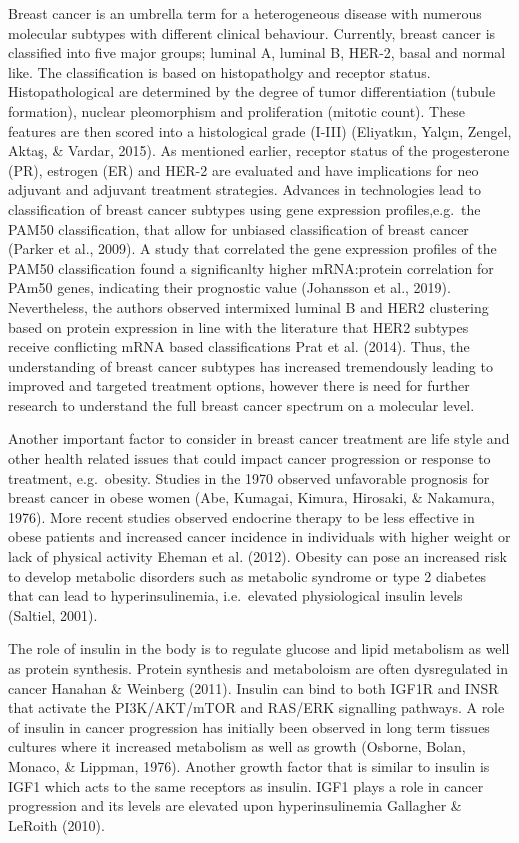 \documentclass[
  12pt,
  openany]{book}
\begin{document}
Breast cancer is an umbrella term for a heterogeneous disease with numerous molecular subtypes with different clinical behaviour. Currently, breast cancer is classified into five major groups; luminal A, luminal B, HER-2, basal and normal like. The classification is based on histopatholgy and receptor status. Histopathological are determined by the degree of tumor differentiation (tubule formation), nuclear pleomorphism and proliferation (mitotic count). These features are then scored into a histological grade (I-III) (Eliyatkın, Yalçın, Zengel, Aktaş, \& Vardar, 2015). As mentioned earlier, receptor status of the progesterone (PR), estrogen (ER) and HER-2 are evaluated and have implications for neo adjuvant and adjuvant treatment strategies. Advances in technologies lead to classification of breast cancer subtypes using gene expression profiles,e.g.~the PAM50 classification, that allow for unbiased classification of breast cancer (Parker et al., 2009). A study that correlated the gene expression profiles of the PAM50 classification found a significanlty higher mRNA:protein correlation for PAm50 genes, indicating their prognostic value (Johansson et al., 2019). Nevertheless, the authors observed intermixed luminal B and HER2 clustering based on protein expression in line with the literature that HER2 subtypes receive conflicting mRNA based classifications Prat et al. (2014). Thus, the understanding of breast cancer subtypes has increased tremendously leading to improved and targeted treatment options, however there is need for further research to understand the full breast cancer spectrum on a molecular level.

Another important factor to consider in breast cancer treatment are life style and other health related issues that could impact cancer progression or response to treatment, e.g.~obesity. Studies in the 1970 observed unfavorable prognosis for breast cancer in obese women (Abe, Kumagai, Kimura, Hirosaki, \& Nakamura, 1976). More recent studies observed endocrine therapy to be less effective in obese patients and increased cancer incidence in individuals with higher weight or lack of physical activity Eheman et al. (2012). Obesity can pose an increased risk to develop metabolic disorders such as metabolic syndrome or type 2 diabetes that can lead to hyperinsulinemia, i.e.~elevated physiological insulin levels (Saltiel, 2001).

The role of insulin in the body is to regulate glucose and lipid metabolism as well as protein synthesis. Protein synthesis and metaboloism are often dysregulated in cancer Hanahan \& Weinberg (2011). Insulin can bind to both IGF1R and INSR that activate the PI3K/AKT/mTOR and RAS/ERK signalling pathways. A role of insulin in cancer progression has initially been observed in long term tissues cultures where it increased metabolism as well as growth (Osborne, Bolan, Monaco, \& Lippman, 1976). Another growth factor that is similar to insulin is IGF1 which acts to the same receptors as insulin. IGF1 plays a role in cancer progression and its levels are elevated upon hyperinsulinemia Gallagher \& LeRoith (2010).
\end{document}
